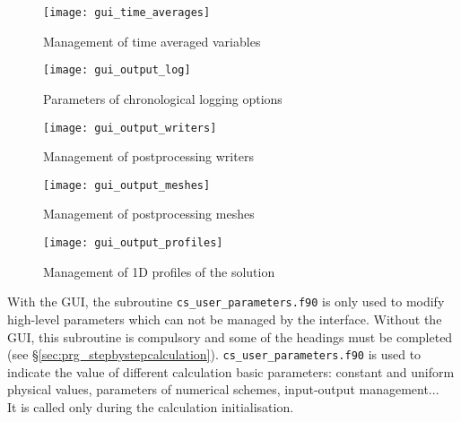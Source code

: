 {{{\begin{figure}[!ht]
\begin{center}
\texttt{[image: gui\_time\_averages]}
\caption{Management of time averaged variables}
\label{fig:gui_time_averages}
\end{center}
\end{figure}

\begin{figure}[!ht]
\begin{center}
\texttt{[image: gui\_output\_log]}
\caption{Parameters of chronological logging options}
\label{fig:gui_output_log}
\end{center}
\end{figure}

\begin{figure}[!ht]
\begin{center}
\texttt{[image: gui\_output\_writers]}
\caption{Management of postprocessing writers}
\label{fig:gui_output_writers}
\end{center}
\end{figure}

\begin{figure}[!ht]
\begin{center}
\texttt{[image: gui\_output\_meshes]}
\caption{Management of postprocessing meshes}
\label{fig:gui_output_meshes}
\end{center}
\end{figure}

\begin{figure}[!ht]
\begin{center}
\texttt{[image: gui\_output\_profiles]}
\caption{Management of 1D profiles of the solution}
\label{fig:gui_output_profiles}
\end{center}
\end{figure}

With the GUI, the subroutine \texttt{cs\_user\_parameters.f90} is only
used to modify high-level parameters which can not be managed by the
interface. Without the GUI, this
subroutine is compulsory and some of the headings must be completed (see \S\ref{sec:prg_stepbystepcalculation}).
\texttt{cs\_user\_parameters.f90}
is used to indicate the value of different calculation
basic parameters: constant and uniform physical values, parameters of
numerical schemes, input-output management...\\
It is called only during the calculation initialisation.

}}}
